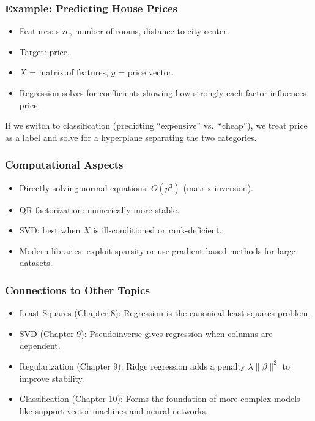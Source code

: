 \documentclass[
  letterpaper,
  DIV=11,
  numbers=noendperiod]{scrreprt}
\providecommand{\tightlist}{%
  \setlength{\itemsep}{0pt}\setlength{\parskip}{0pt}}
\begin{document}
\subsubsection{Example: Predicting House
Prices}\label{example-predicting-house-prices}

\begin{itemize}
\tightlist
\item
  Features: size, number of rooms, distance to city center.
\item
  Target: price.
\item
  \(X\) = matrix of features, \(y\) = price vector.
\item
  Regression solves for coefficients showing how strongly each factor
  influences price.
\end{itemize}

If we switch to classification (predicting ``expensive'' vs.~``cheap''),
we treat price as a label and solve for a hyperplane separating the two
categories.

\subsubsection{Computational Aspects}\label{computational-aspects}

\begin{itemize}
\tightlist
\item
  Directly solving normal equations: \(O(p^3)\) (matrix inversion).
\item
  QR factorization: numerically more stable.
\item
  SVD: best when \(X\) is ill-conditioned or rank-deficient.
\item
  Modern libraries: exploit sparsity or use gradient-based methods for
  large datasets.
\end{itemize}

\subsubsection{Connections to Other
Topics}\label{connections-to-other-topics}

\begin{itemize}
\tightlist
\item
  Least Squares (Chapter 8): Regression is the canonical least-squares
  problem.
\item
  SVD (Chapter 9): Pseudoinverse gives regression when columns are
  dependent.
\item
  Regularization (Chapter 9): Ridge regression adds a penalty
  \(\lambda \|\beta\|^2\) to improve stability.
\item
  Classification (Chapter 10): Forms the foundation of more complex
  models like support vector machines and neural networks.
\end{itemize}
\end{document}
